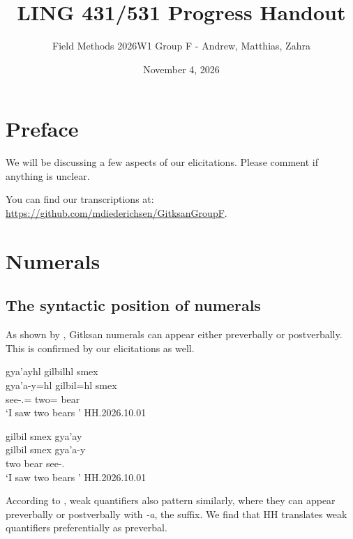 \documentclass{article}
\begin{document}
\title{LING 431/531 Progress Handout}
\author{Field Methods 2026W1 Group F - Andrew, Matthias, Zahra}
\date{November 4, 2026}
\maketitle

\tableofcontents

\section{Preface}

We will be discussing a few aspects of our elicitations. Please comment if anything is unclear.

You can find our transcriptions at: \url{https://github.com/mdiederichsen/GitksanGroupF}.

\section{Numerals}
\subsection{The syntactic position of numerals}
As shown by \textcite{bicevskisQuantificationGitksan2017}, Gitksan numerals can appear either preverbally or postverbally. This is confirmed by our elicitations as well.

\begin{exe}
    \ex 
    \begin{xlist}
    \item     \label{ex:postgilbil} \glll gya'ayhl gilbilhl smex \\
    gya'a-y=hl gilbil=hl smex \\
    see-\Fsg{}.\Ii{}=\Cn{} two=\Cn{} bear \\
    `I saw two bears ' \hfill HH.2026.10.01
    \item \label{ex:pregilbil} \glll gilbil smex gya'ay \\
    gilbil smex gya'a-y \\
    two bear see-\Fsg{}.\Ii{} \\
    `I saw two bears ' \hfill HH.2026.10.01
    \end{xlist}
\end{exe}

According to \textcite{bicevskisQuantificationGitksan2017}, weak quantifiers also pattern similarly, where they can appear preverbally or postverbally with \textit{-a}, the \Attr{} suffix. We find that HH translates weak quantifiers preferentially as preverbal.
\end{document}

